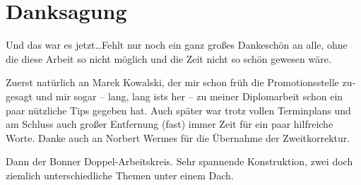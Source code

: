 \chapter*{Danksagung}
\label{sec:ack}

\begin{otherlanguage}{ngerman}
Und das war es jetzt\dots Fehlt nur noch ein ganz gro\ss{}es Dankesch\"on an 
alle, ohne die diese Arbeit so nicht m\"oglich und die Zeit nicht so sch\"on 
gewesen w\"are.

Zuerst nat\"urlich an Marek Kowalski, der mir schon fr\"uh die Promotionsstelle 
zugesagt und mir sogar -- lang, lang ists her -- zu meiner Diplomarbeit schon 
ein paar n\"utzliche Tips gegeben hat. Auch sp\"ater war trotz vollen 
Terminplans und am Schluss auch gro\ss{}er Entfernung (fast) immer Zeit f\"ur 
ein paar hilfreiche Worte.
Danke auch an Norbert Wermes f\"ur die \"Ubernahme der Zweitkorrektur.

Dann der Bonner Doppel-Arbeitskreis. Sehr spannende Konstruktion, zwei doch 
ziemlich unterschiedliche Themen unter einem Dach.


\end{otherlanguage}


